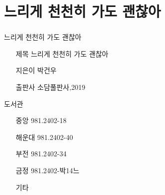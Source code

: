 \documentclass[aspectratio=1610,17pt,xcolor=pdftex,dvipsnames,table,handout]{beamer}
\begin{document}
		\section{느리게 천천히 가도 괜찮아}
		\begin{frame} [t,plain]
		\frametitle{}

			\begin{block} {느리게 천천히 가도 괜찮아}
			\setlength{\leftmargini}{4em}			
			\begin{itemize}
				\item [제목]  	느리게 천천히 가도 괜찮아
				\item [지은이]	박건우
				\item [출판사]	소담풀판사,2019
			\end{itemize}
			\end{block}						

			\begin{block} {도서관}
			\setlength{\leftmargini}{4em}			
			\begin{itemize}
				\item [중앙]  	981.2402-18
				\item [해운대]	981.2402-40
				\item [부전]	981.2402-34
				\item [금정]	981.2402-박14느
				\item [기타]	
			\end{itemize}
			\end{block}						

		\end{frame}						



\end{document}
